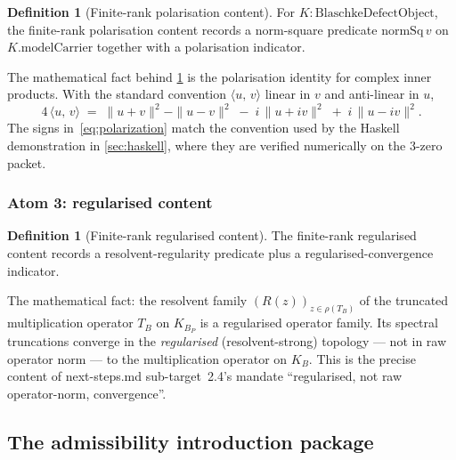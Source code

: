 \documentclass[12pt]{article}
\theoremstyle{definition}
\newtheorem{definition}[theorem]{Definition}
\theoremstyle{remark}
\newcommand{\KB}{K_{B}}
\newcommand{\KBP}{K_{B_{P}}}
\newcommand{\inn}[2]{\langle #1,\, #2 \rangle}
\begin{document}
\begin{definition}[Finite-rank polarisation content]\label{def:finiteRankPol}
For $K : \mathrm{BlaschkeDefectObject}$, the finite-rank polarisation content records a norm-square predicate $\mathrm{normSq}\,v$ on $K.\mathrm{modelCarrier}$ together with a polarisation indicator.
\end{definition}

The mathematical fact behind \cref{def:finiteRankPol} is the polarisation identity for complex inner products. With the standard convention $\inn{u}{v}$ linear in $v$ and anti-linear in $u$,
\begin{equation}\label{eq:polarization}
  4\,\inn{u}{v}
  \;=\;
  \|u + v\|^{2} - \|u - v\|^{2} \;-\; i\,\|u + iv\|^{2} \;+\; i\,\|u - iv\|^{2}.
\end{equation}
The signs in~\eqref{eq:polarization} match the convention used by the Haskell demonstration in \cref{sec:haskell}, where they are verified numerically on the 3-zero packet.

\subsubsection{Atom 3: regularised content}

\begin{definition}[Finite-rank regularised content]\label{def:finiteRankReg}
The finite-rank regularised content records a resolvent-regularity predicate plus a regularised-convergence indicator.
\end{definition}

The mathematical fact: the resolvent family $(R(z))_{z \in \rho(T_{B})}$ of the truncated multiplication operator $T_{B}$ on $\KBP$ is a regularised operator family. Its spectral truncations converge in the \emph{regularised} (resolvent-strong) topology --- not in raw operator norm --- to the multiplication operator on $\KB$. This is the precise content of next-steps.md sub-target~2.4's mandate ``regularised, not raw operator-norm, convergence''.

\subsection{The admissibility introduction package}\label{subsec:admissibilityPackage}
\end{document}
